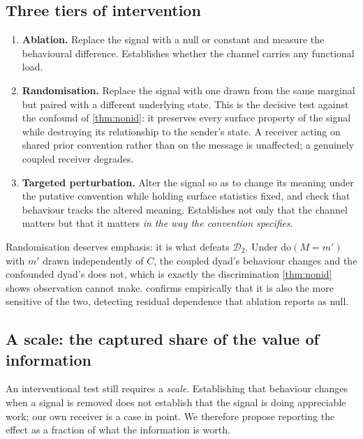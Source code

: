 \documentclass[11pt,a4paper]{article}
\theoremstyle{plain}
\theoremstyle{definition}
\theoremstyle{remark}
\newcommand{\Dy}{\mathcal{D}}
\newcommand{\dop}{\mathrm{do}}
\begin{document}
\subsection{Three tiers of intervention}

\begin{enumerate}[leftmargin=1.6em, itemsep=3pt]
    \item \textbf{Ablation.} Replace the signal with a null or constant and measure the behavioural
    difference. Establishes whether the channel carries any functional load.
    \item \textbf{Randomisation.} Replace the signal with one drawn from the same marginal but paired
    with a different underlying state. This is the decisive test against the confound of
    \cref{thm:nonid}: it preserves every surface property of the signal while destroying its
    relationship to the sender's state. A receiver acting on shared prior convention rather than on
    the message is unaffected; a genuinely coupled receiver degrades.
    \item \textbf{Targeted perturbation.} Alter the signal so as to change its meaning under the
    putative convention while holding surface statistics fixed, and check that behaviour tracks the
    altered meaning. Establishes not only that the channel matters but that it matters \emph{in the way
    the convention specifies}.
\end{enumerate}

Randomisation deserves emphasis: it is what defeats $\Dy_2$. Under $\dop(M = m')$ with $m'$ drawn
independently of $C$, the coupled dyad's behaviour changes and the confounded dyad's does not, which is
exactly the discrimination \cref{thm:nonid} shows observation cannot make.  confirms
empirically that it is also the more sensitive of the two, detecting residual dependence that ablation
reports as null.

\subsection{A scale: the captured share of the value of information}\label{sec:rho}

An interventional test still requires a \emph{scale}. Establishing that behaviour changes when a signal
is removed does not establish that the signal is doing appreciable work; our own receiver is a case in
point. We therefore propose reporting the effect as a fraction of what the information is worth.
\end{document}
